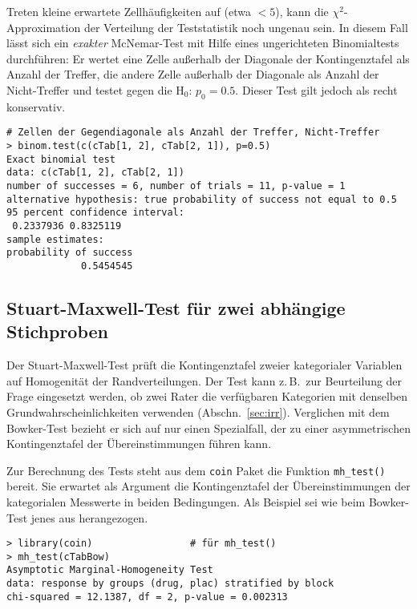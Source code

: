 Treten kleine erwartete Zellhäufigkeiten auf (etwa $< 5$), kann die $\chi^{2}$-Approximation der Verteilung der Teststatistik noch ungenau sein. In diesem Fall lässt sich ein \emph{exakter} McNemar-Test mit Hilfe eines ungerichteten Binomialtests durchführen: Er wertet eine Zelle außerhalb der Diagonale der Kontingenztafel als Anzahl der Treffer, die andere Zelle außerhalb der Diagonale als Anzahl der Nicht-Treffer und testet gegen die $\text{H}_{0}$:  $p_{0} = 0.5$. Dieser Test gilt jedoch als recht konservativ.
\begin{lstlisting}
# Zellen der Gegendiagonale als Anzahl der Treffer, Nicht-Treffer
> binom.test(c(cTab[1, 2], cTab[2, 1]), p=0.5)
Exact binomial test
data: c(cTab[1, 2], cTab[2, 1])
number of successes = 6, number of trials = 11, p-value = 1
alternative hypothesis: true probability of success not equal to 0.5
95 percent confidence interval:
 0.2337936 0.8325119
sample estimates:
probability of success
             0.5454545
\end{lstlisting}

\subsection{Stuart-Maxwell-Test für zwei abhängige Stichproben}
\label{sec:stuartMaxwell}

Der Stuart-Maxwell-Test prüft die Kontingenztafel zweier kategorialer Variablen auf Homogenität der Randverteilungen. Der Test kann z.\,B.\ zur Beurteilung der Frage eingesetzt werden, ob zwei Rater die verfügbaren Kategorien mit denselben Grundwahrscheinlichkeiten verwenden (Abschn.\ \ref{sec:irr}). Verglichen mit dem Bowker-Test bezieht er sich auf nur einen Spezialfall, der zu einer asymmetrischen Kontingenztafel der Übereinstimmungen führen kann.

Zur Berechnung des Tests steht aus dem \lstinline!coin! Paket die Funktion \lstinline!mh_test()! bereit. Sie erwartet als Argument die Kontingenztafel der Übereinstimmungen der kategorialen Messwerte in beiden Bedingungen. Als Beispiel sei wie beim Bowker-Test jenes aus  herangezogen.
\begin{lstlisting}
> library(coin)                 # für mh_test()
> mh_test(cTabBow)
Asymptotic Marginal-Homogeneity Test
data: response by groups (drug, plac) stratified by block
chi-squared = 12.1387, df = 2, p-value = 0.002313
\end{lstlisting}

